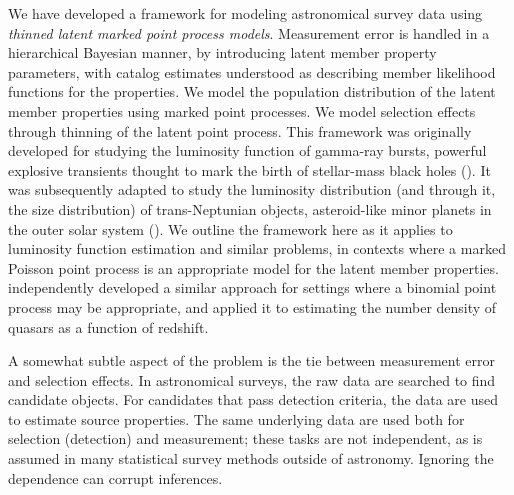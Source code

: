 We have developed a framework for modeling astronomical survey data using \emph{thinned latent marked point process models}.
Measurement error is handled in a hierarchical Bayesian manner, by introducing latent member property parameters, with catalog estimates understood as describing member likelihood functions for the properties.
We model the population distribution of the latent member properties using marked point processes.
We model selection effects through thinning of the latent point process.
This framework was originally developed for studying the luminosity function of gamma-ray bursts, powerful explosive transients thought to mark the birth of stellar-mass black holes (\citealt{LW95-GRBs-TLPP,LW98-GRBs-Iso}).
It was subsequently adapted to study the luminosity distribution (and through it, the size distribution) of trans-Neptunian objects, asteroid-like minor planets in the outer solar system (\citealt{L04-MsmtErr,P+08-TNOSizeDistn}).
We outline the framework here as it applies to luminosity function estimation and similar problems, in contexts where a marked Poisson point process is an appropriate model for the latent member properties.
\cite{kelly2008flexible} independently developed a similar approach for settings where a binomial point process may be appropriate, and applied it to estimating the number density of quasars as a function of redshift.

A somewhat subtle aspect of the problem is the tie between measurement error and selection effects.
In astronomical surveys, the raw data are searched to find candidate objects.
For candidates that pass detection criteria, the data are used to estimate source properties.
The same underlying data are used both for selection (detection) and measurement; these tasks are not independent, as is assumed in many statistical survey methods outside of astronomy.
Ignoring the dependence can corrupt inferences.


